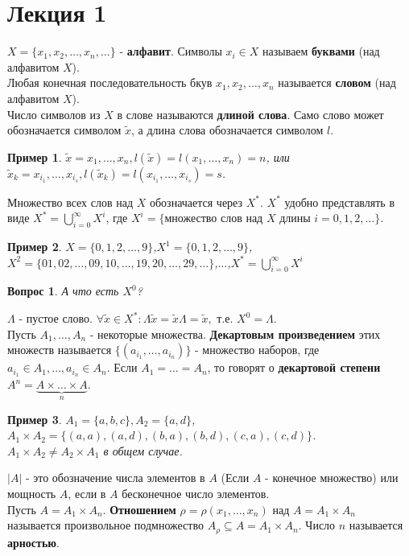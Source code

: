 \documentclass{article}
\newtheorem{example}{Пример}
\newtheorem{question}{Вопрос}
\numberwithin{example}{section}
\numberwithin{question}{section}
\numberwithin{Remark}{section}
\numberwithin{theorem}{section}
\numberwithin{definition}{section}
\numberwithin{proposition}{section}
\begin{document}
\section{Лекция 1}
$X=\{x_1,x_2,\ldots,x_n,\ldots \}$ - \textbf{алфавит}. Символы $x_i\in X$ называем \textbf{буквами} (над алфавитом $X$).\\
Любая конечная последовательность бкув $x_1,x_2,\ldots,x_n$ называется \textbf{словом} (над алфавитом $X$). \\
Число символов из $X$ в слове называются \textbf{длиной слова}. Само слово может обозначается символом $\tilde{x}$, а длина слова обозначается символом $l$.
\begin{example}
	$\tilde{x}=x_1,\ldots,x_n,l(\tilde{x})=l(x_1,\ldots,x_n)=n$, или $\tilde{x}_k=x_{i_1},\ldots,x_{i_s},l(\tilde{x}_k)=l(x_{i_1},\ldots,x_{i_s})=s$.
\end{example}
Множество всех слов над $X$ обозначается через $X^*$. $X^*$ удобно представлять в виде $X^*=\bigcup\limits^{\infty}_{i=0}X^i$, где $X^i=\{\text{множество слов над } X \text{ длины } i=0,1,2,\ldots\}$.
\begin{example}
	$X=\{0,1,2,\ldots,9\}$,$X^1=\{0,1,2,\ldots,9\}$,\\
	$X^2=\{01,02,\ldots,09,10,\ldots,19,20,\ldots,29,\ldots \}$,$\ldots$,$X^*=\bigcup\limits^{\infty}_{i=0}X^i$
\end{example}
\begin{question}
	 А что есть $X^0$?
\end{question}
$\Lambda$ - пустое слово. $\forall \tilde{x}\in X^*:\Lambda \tilde{x}=\tilde{x}\Lambda=\tilde{x},$ т.е. $X^0=\Lambda$.\\
Пусть $A_1,\ldots,A_n$ - некоторые множества. \textbf{Декартовым произведением} этих множеств называется $\{(a_{i_1},\ldots,a_{i_n}) \}$ - множество наборов, где $a_{i_1}\in A_1,\ldots,a_{i_n}\in A_n$. Если $A_1=\ldots=A_n$, то говорят о \textbf{декартовой степени} $A^n=\underbrace{A\times\ldots\times A}_{n}$. 
\begin{example}
	$A_1=\{a,b,c\},A_2=\{a,d\}$,$A_1\times A_2=\{(a,a),(a,d),(b,a),(b,d),(c,a),(c,d) \}$.\\
	$A_1\times A_2\ne A_2\times A_1$ в общем случае.
\end{example}
$|A|$ - это обозначение числа элементов в $A$ (Если $A$ - конечное множество)  или мощность $A$, если в $A$ бесконечное число элементов.\\
Пусть $A=A_1\times A_n$. \textbf{Отношением} $\rho=\rho(x_1,\ldots,x_n)$ над $A=A_1\times A_n$ называется произвольное подмножество $A_{\rho}\subseteq A=A_1\times A_n$. Число $n$ называется \textbf{арностью}.
\end{document}
